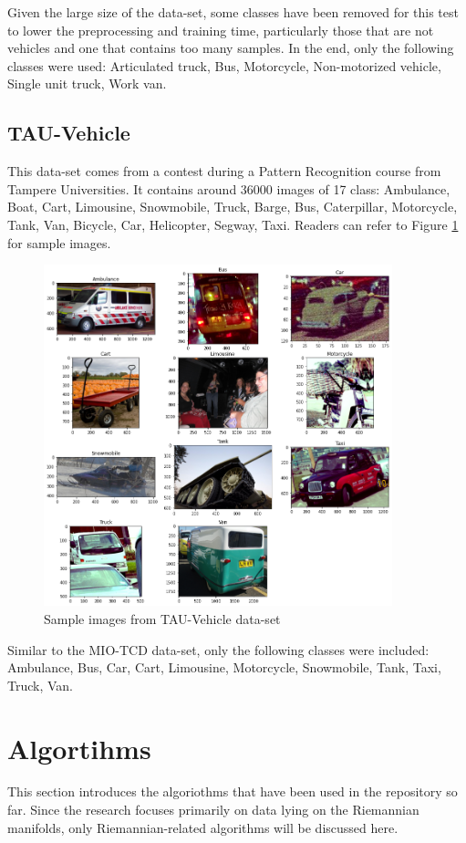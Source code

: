 \documentclass[12pt]{article}
\begin{document}
\begin{sloppypar}
\noindent
Given the large size of the data-set, some classes have been removed for this test to lower the preprocessing and training time, particularly those that are not vehicles and one that contains too many samples. In the end, only the following classes were used: Articulated truck, Bus, Motorcycle, Non-motorized vehicle, Single unit truck, Work van.

\subsection{TAU-Vehicle}
This data-set comes from a contest during a Pattern Recognition course from Tampere Universities. It contains around 36000 images of 17 class: Ambulance, Boat, Cart, Limousine, Snowmobile, Truck, Barge, Bus, Caterpillar, Motorcycle, Tank, Van, Bicycle, Car, Helicopter, Segway, Taxi. Readers can refer to Figure \ref{img:TAU-images} for sample images.

\begin{figure}[hbt!]
\caption{Sample images from TAU-Vehicle data-set}
\label{img:TAU-images}
\centering
\includegraphics[width=0.9\textwidth]{TAU_images.png}
\end{figure}

\noindent
Similar to the MIO-TCD data-set, only the following classes were included: Ambulance, Bus, Car, Cart, Limousine, Motorcycle, Snowmobile, Tank, Taxi, Truck, Van.


\section{Algortihms}
This section introduces the algoriothms that have been used in the repository so far. Since the research focuses primarily on data lying on the Riemannian manifolds, only Riemannian-related algorithms will be discussed here.


\end{sloppypar}
\end{document}

